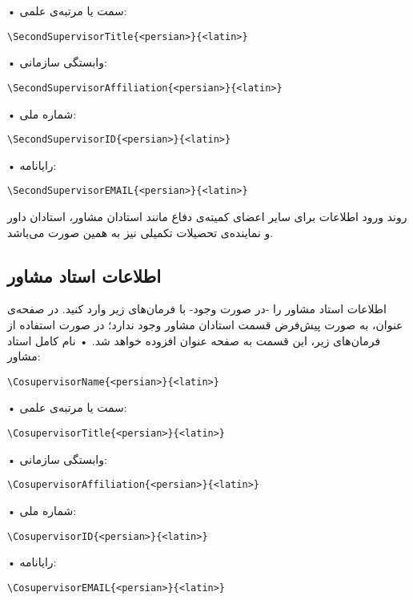 \documentclass[%
12pt,%
twoside, %
openany, %
notitlepage,%
fleqn,%
]{article}
\numberwithin{equation}{section} %
\begin{document}
• سمت یا مرتبه‌ی علمی:
\begin{latin}\begin{verbatim}
\SecondSupervisorTitle{<persian>}{<latin>}
\end{verbatim} \end{latin}
• وابستگی سازمانی:
\begin{latin}\begin{verbatim}
\SecondSupervisorAffiliation{<persian>}{<latin>}
\end{verbatim} \end{latin}
• شماره ملی:
\begin{latin}\begin{verbatim}
\SecondSupervisorID{<persian>}{<latin>}
\end{verbatim} \end{latin}
• رایانامه:
\begin{latin}\begin{verbatim}
\SecondSupervisorEMAIL{<persian>}{<latin>}
\end{verbatim} \end{latin}

روند ورود اطلاعات برای سایر اعضای کمیته‌ی دفاع مانند استادان مشاور، استادان داور و نماینده‌ی تحصیلات تکمیلی نیز به همین صورت می‌باشد\@. 
\subsection{اطلاعات استاد مشاور}
اطلاعات استاد مشاور را -در صورت وجود- با فرمان‌های زیر وارد کنید\@. در صفحه‌ی عنوان، به صورت پیش‌فرض قسمت استادان مشاور وجود ندارد؛ در صورت استفاده از فرمان‌های زیر، این قسمت به صفحه عنوان افزوده خواهد شد\@. 
• نام کامل استاد مشاور:
\begin{latin}\begin{verbatim}
\CosupervisorName{<persian>}{<latin>}
\end{verbatim} \end{latin}
• سمت یا مرتبه‌ی علمی:
\begin{latin}\begin{verbatim}
\CosupervisorTitle{<persian>}{<latin>}
\end{verbatim} \end{latin}
• وابستگی سازمانی:
\begin{latin}\begin{verbatim}
\CosupervisorAffiliation{<persian>}{<latin>}
\end{verbatim} \end{latin}
• شماره ملی:
\begin{latin}\begin{verbatim}
\CosupervisorID{<persian>}{<latin>}
\end{verbatim} \end{latin}
• رایانامه:
\begin{latin}\begin{verbatim}
\CosupervisorEMAIL{<persian>}{<latin>}
\end{verbatim} \end{latin}
\end{document}
